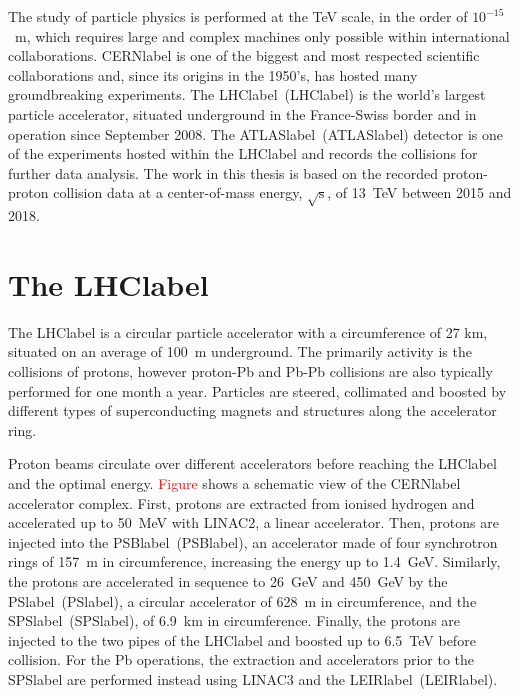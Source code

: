The study of particle physics is performed at the TeV scale, in the order of $10^{-15}$~m, which requires large and complex machines only possible within international collaborations. \acrshort{CERNlabel} is one of the biggest and most respected scientific collaborations and, since its origins in the 1950's, has hosted many groundbreaking experiments. The \acrlong{LHClabel}~(\acrshort{LHClabel}) is the world's largest particle accelerator, situated underground in the France-Swiss border and in operation since September 2008. The \acrlong{ATLASlabel}~(\acrshort{ATLASlabel}) detector is one of the experiments hosted within the \acrshort{LHClabel} and records the collisions for further data analysis. The work in this thesis is based on the recorded proton-proton collision data at a center-of-mass energy, $\sqrt{\text{s}}$, of 13~TeV between 2015 and 2018.

\section{The \acrshort{LHClabel}}

The \acrshort{LHClabel} is a circular particle accelerator with a circumference of 27 km, situated on an average of 100~m underground. The primarily activity is the collisions of protons, however proton-Pb and Pb-Pb collisions are also typically performed for one month a year. Particles are steered, collimated and boosted by different types of superconducting magnets and structures along the accelerator ring.

Proton beams circulate over different accelerators before reaching the \acrshort{LHClabel} and the optimal energy. \textcolor{red}{Figure} shows a schematic view of the \acrshort{CERNlabel} accelerator complex. First, protons are extracted from ionised hydrogen and accelerated up to 50~MeV with LINAC2, a linear accelerator. Then, protons are injected into the \acrlong{PSBlabel}~(\acrshort{PSBlabel}), an accelerator made of four synchrotron rings of 157~m in circumference, increasing the energy up to 1.4~GeV. Similarly, the protons are accelerated in sequence to 26~GeV and 450~GeV by the \acrlong{PSlabel}~(\acrshort{PSlabel}), a circular accelerator of 628~m in circumference, and the \acrlong{SPSlabel}~(\acrshort{SPSlabel}), of 6.9~km in circumference. Finally, the protons are injected to the two pipes of the \acrshort{LHClabel} and boosted up to 6.5~TeV before collision. For the Pb operations, the extraction and accelerators prior to the \acrshort{SPSlabel} are performed instead using LINAC3 and the \acrlong{LEIRlabel}~(\acrshort{LEIRlabel}).

